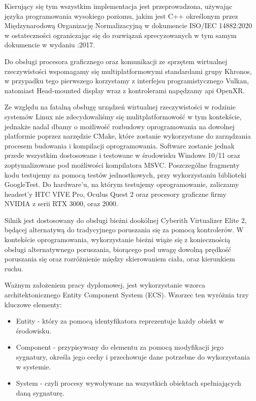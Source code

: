 Kierujący się tym wszystkim implementacja jest przeprowadzona, używając języka programowania wysokiego poziomu, jakim jest C++ określonym przez Międzynarodową Organizację Normalizacyjną w dokumencie ISO/IEC 14882:2020 w ostateczności ograniczając się do rozwiązań sprecyzowanych w tym samym dokumencie w wydaniu :2017. 

Do obsługi procesora graficznego oraz komunikacji ze sprzętem wirtualnej rzeczywistości wspomagamy się multiplatformowymi standardami grupy Khronos, w przypadku tego pierwszego korzystamy z interfejsu programistycznego Vulkan, natomiast Head-mounted display wraz z kontrolerami napędzamy api OpenXR. 

Ze względu na fatalną obsługę urządzeń wirtualnej rzeczywistości w rodzinie systemów Linux nie zdecydowaliśmy się mulitplatformowość w tym kontekście, jednakże nadal dbamy o możliwość rozbudowy oprogramowania na dowolnej platformie poprzez narzędzie CMake, które zostanie wykorzystane do zarządzania procesem budowania i kompilacji oprogramowania. Software zostanie jednak przede wszystkim dostosowane i testowane w środowisku Windows 10/11 oraz zoptymalizowane pod możliwości kompilatora MSVC. Poszczególne fragmenty kodu testujemy za pomocą testów jednostkowych, przy wykorzystaniu biblioteki GoogleTest. Do hardware’u, na którym testujemy oprogramowanie, zaliczamy headset’y HTC VIVE Pro, Oculus Quest 2 oraz procesory graficzne firmy NVIDIA z serii RTX 3000, oraz 2000. 

Silnik jest dostosowany do obsługi bieżni dookólnej Cyberith Virtualizer Elite 2, będącej alternatywą do tradycyjnego poruszania się za pomocą kontrolerów. W kontekście oprogramowania, wykorzystanie bieżni wiąże się z koniecznością obsługi alternatywnego poruszania, biorącego pod uwagę dowolną prędkość poruszania się oraz rozróżnienie między skierowaniem ciała, oraz kierunkiem ruchu. 

Ważnym założeniem pracy dyplomowej, jest wykorzystanie wzorca architektonicznego Entity Component System (ECS). Wzorzec ten wyróżnia trzy kluczowe elementy: 

\begin{itemize}
    \item Entity - który za pomocą identyfikatora reprezentuje każdy obiekt w środowisku.
    \item Component - przypisywany do elementu za pomocą modyfikacji jego sygnatury, określa jego cechy i przechowuje dane potrzebne do wykorzystania w systemie. 
    \item System - czyli procesy wywoływane na wszystkich obiektach spełniających daną sygnaturę. 
\end{itemize}


